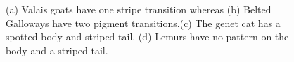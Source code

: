 \begin{figure}[!!!h!!!tbp]
\caption{(a) Valais goats have one stripe transition whereas (b) Belted Galloways have two pigment transitions.(c) The genet cat has a spotted body and striped tail. (d) Lemurs have no pattern on the body and a striped tail. \label{Real_patterns}}
\end{figure}





